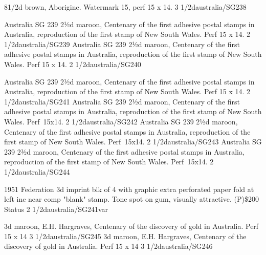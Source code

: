 %
{81/2d brown, Aborigine. Watermark 15, perf 15 x 14.}%
{3 1/2d}{australia/SG238}{}{}{}{}%

{Australia SG 239 2½d maroon, Centenary of the first adhesive postal stamps in Australia, reproduction of the first stamp of New South Wales. Perf 15 x 14.}%
{2 1/2d}{australia/SG239}{}{}{}{}%
%
{Australia SG 239 2½d maroon, Centenary of the first adhesive postal stamps in Australia, reproduction of the first stamp of New South Wales. Perf 15 x 14.}%
{2 1/2d}{australia/SG240}{}{}{}{}%

%
{Australia SG 239 2½d maroon, Centenary of the first adhesive postal stamps in Australia, reproduction of the first stamp of New South Wales. Perf 15 x 14.}%
{2 1/2d}{australia/SG241}{}{}{}{}%
%
{Australia SG 239 2½d maroon, Centenary of the first adhesive postal stamps in Australia, reproduction of the first stamp of New South Wales. \hbox{Perf 15x14}.}%
{2 1/2d}{australia/SG242}{}{}{}{}%
%
{Australia SG 239 2½d maroon, Centenary of the first adhesive postal stamps in Australia, reproduction of the first stamp of New South Wales. \hbox{Perf 15x14}.}%
{2 1/2d}{australia/SG243}{}{}{}{}%
%
{Australia SG 239 2½d maroon, Centenary of the first adhesive postal stamps in Australia, reproduction of the first stamp of New South Wales. \hbox{Perf 15x14}.}%
{2 1/2d}{australia/SG244}{}{}{}{}%

%
{1951 Federation 3d imprint blk of 4 with graphic extra perforated paper fold at left inc near comp "blank" stamp. Tone spot on gum, visually attractive. (P)\$200 Status}%
{2 1/2d}{australia/SG241var}{}{}{}{}%

{3d maroon, E.H. Hargraves, Centenary of the discovery of gold in Australia. Perf 15 x 14}%
{3 1/2d}{australia/SG245}{}{}{}{}%
{3d maroon, E.H. Hargraves, Centenary of the discovery of gold in Australia. Perf 15 x 14}%
{3 1/2d}{australia/SG246}{}{}{}{}%

